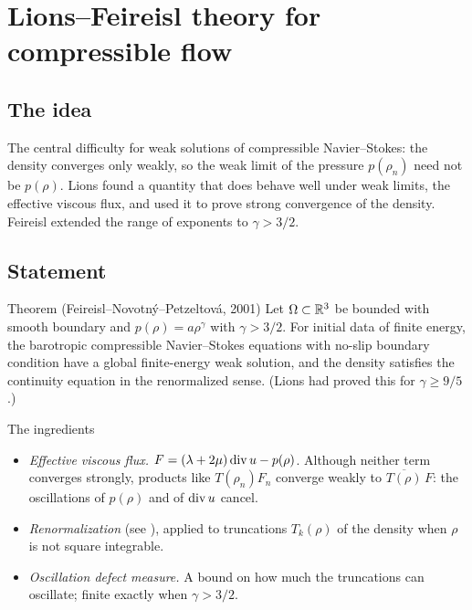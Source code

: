 
\section{Lions--Feireisl theory for compressible flow}\label{p:lions-feireisl}


\subsection*{The idea}

The central difficulty for weak solutions of compressible Navier--Stokes: the density converges only weakly, so the weak limit of the pressure $p(\rho_n)$ need not be $p(\rho)$. Lions found a quantity that does behave well under weak limits, the effective viscous flux, and used it to prove strong convergence of the density. Feireisl extended the range of exponents to $\gamma> 3/2$.

\subsection*{Statement}

\begin{thmbox}{Theorem (Feireisl--Novotný--Petzeltová, 2001)}
%
Let $\Omega\subset\mathbb{R}^3$ be bounded with smooth boundary and $p(\rho)=a\rho^\gamma$ with $\gamma> 3/2$. For initial data of finite energy, the barotropic compressible Navier--Stokes equations with no-slip boundary condition have a global finite-energy weak solution, and the density satisfies the continuity equation in the renormalized sense. (Lions had proved this for $\gamma\ge9/5$.)
\end{thmbox}

\begin{rmkbox}{The ingredients}
\begin{itemize}
\item \emph{Effective viscous flux.} $F = (\lambda+2\mu)\operatorname{div} u - p(\rho)$. Although neither term converges strongly, products like $T(\rho_n)F_n$ converge weakly to $\overline{T(\rho)}\,F$: the oscillations of $p(\rho)$ and of $\operatorname{div} u$ cancel.
\item \emph{Renormalization} (see ), applied to truncations $T_k(\rho)$ of the density when $\rho$ is not square integrable.
\item \emph{Oscillation defect measure.} A bound on how much the truncations can oscillate; finite exactly when $\gamma> 3/2$.
\end{itemize}
\end{rmkbox}

